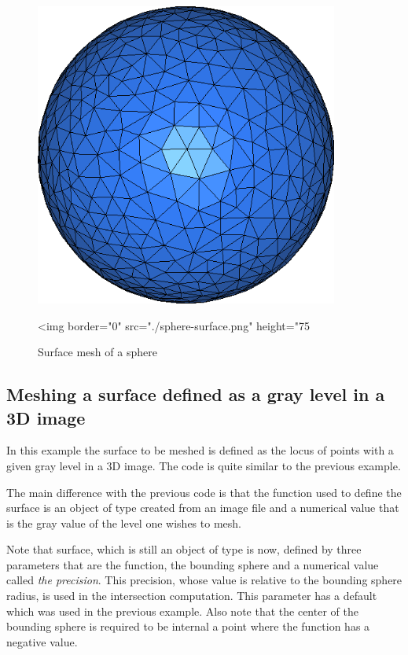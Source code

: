 \begin{figure}[h]
  \begin{center}
    \begin{ccTexOnly}
      \includegraphics[height=10cm]{Surface_mesher/sphere-surface}
    \end{ccTexOnly}
    \begin{ccHtmlOnly}
      <img border="0" src="./sphere-surface.png" height="75%
    \end{ccHtmlOnly}
  \end{center}
  \caption{Surface mesh of a sphere}
  \label{figure:Surface_mesher-sphere-surface}
\end{figure}


\subsection{Meshing a surface defined as a gray level in a 3D image}
In this example the surface to be meshed is defined
as the locus of points with a given gray level
in a 3D image.
The code is quite similar to the previous example. 

The main difference with the previous code 
is that the function used to define the surface
is  an object of type   created from
an image file and a numerical value that is  the
 gray value of the level one wishes to mesh.

Note that  surface, which is still an object of type  
is now, defined by three parameters that are the function, the bounding
sphere and a numerical value called {\em the precision}. This
precision, whose value
is relative to the bounding sphere radius, is used in the intersection
computation.
This parameter has a default which was used in the previous example.
Also note that the center of the bounding sphere is required to be
internal a point where the function has a negative value.

